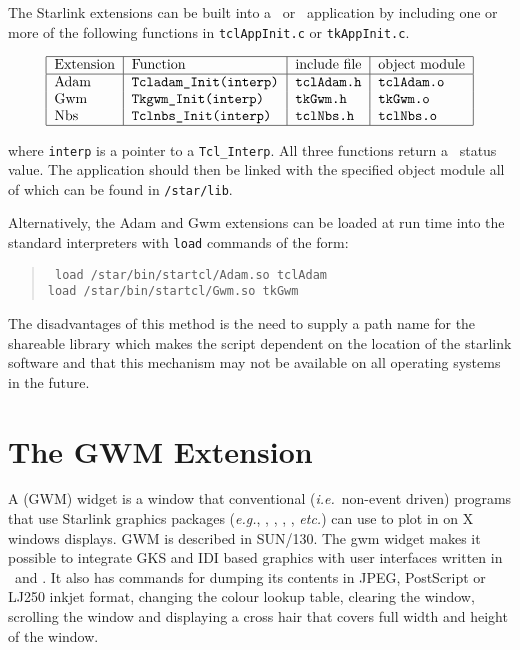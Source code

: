 The Starlink extensions can be built into a \Tcl\ or \Tk\ application
by including one or more of the following functions in
{\tt{tclAppInit.c}} or {\tt{tkAppInit.c}}.

\[\begin{tabular}{|l|l|l|l|}
\hline
Extension &Function &include file &object module\\
\hline
Adam &\tt Tcladam\_Init(interp) &\tt tclAdam.h &\tt tclAdam.o\\
Gwm &\tt Tkgwm\_Init(interp) &\tt tkGwm.h &\tt tkGwm.o\\
Nbs &\tt Tclnbs\_Init(interp) &\tt tclNbs.h &\tt tclNbs.o\\
\hline
\end{tabular}\]

where {\tt{interp}} is a pointer to a {\tt{Tcl\_Interp}}. All three functions
return a \Tcl\ status value. The application should then be linked with the
specified object module all of which can be found in {\tt{/star/lib}}.

Alternatively, 
the Adam and Gwm extensions can be loaded at run time into
the standard interpreters with {\tt{load}} commands of the form:
\begin{quote}{\tt
load /star/bin/startcl/Adam.so tclAdam\\
load /star/bin/startcl/Gwm.so tkGwm
}\end{quote}

The disadvantages of this method is the need to supply a path name for
the shareable library which makes the script dependent on the location
of the starlink software and that this mechanism may not be available
on all operating systems in the future.

\section{\label{gwm_extension}The GWM Extension}

A  (GWM) widget is a window that 
conventional ({\em{i.e.}}\ non-event driven) programs that use
Starlink graphics packages ({\em{e.g.}}, 
, 
, 
, 
, 
 {\em{etc.}}) can use
to plot in on X windows displays. GWM is described in SUN/130. The gwm widget
makes it possible to integrate GKS and IDI based graphics with user interfaces
written in \Tcl\ and \Tk.  It also has commands for dumping its contents 
in JPEG, PostScript or LJ250 inkjet format, changing the colour lookup table,
clearing the window, scrolling the window  and displaying a cross hair
that covers full width and height of the window.

